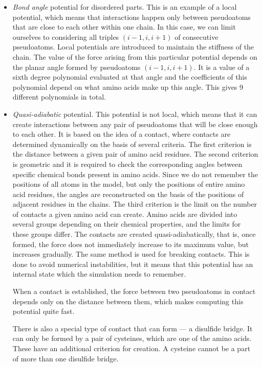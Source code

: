 \begin{itemize}
    \item \emph{Bond angle} potential for disordered parts.
    This is an example of a local potential, which means that interactions happen only between pseudoatoms that are close to each other within one chain. In this case, we can limit ourselves to considering all triples $(i-1,i,i+1)$ of consecutive pseudoatoms. Local potentials are introduced to maintain the stiffness of the chain. 
    The value of the force arising from this particular potential depends on the planar angle formed by pseudoatoms $(i-1,i,i+1)$. It is a value of a sixth degree polynomial evaluated at that angle and the coefficients of this polynomial depend on what amino acids make up this angle. This gives 9 different polynomials in total.
    
    \item \emph{Quasi-adiabatic} potential. This potential is not local, which means that it can create interactions between any pair of pseudoatoms that will be close enough to each other. It is based on the idea of a contact, where contacts are determined dynamically on the basis of several criteria. The first criterion is the distance between a given pair of amino acid residues. The second criterion is geometric and it is required to check the corresponding angles between specific chemical bonds present in amino acids. Since we do not remember the positions of all atoms in the model, but only the positions of entire amino acid residues, the angles are reconstructed on the basis of the positions of adjacent residues in the chains. The third criterion is the limit on the number of contacts a given amino acid can create. Amino acids are divided into several groups depending on their chemical properties, and the limits for these groups differ. The contacts are created quasi-adiabatically, that is, once formed, the force does not immediately increase to its maximum value, but increases gradually. The same method is used for breaking contacts. This is done to avoid numerical instabilities, but it means that this potential has an internal state which the simulation needs to remember.

    When a contact is established, the force between two pseudoatoms in contact depends only on the distance between them, which makes computing this potential quite fast. 
    
    \label{ref:disul} There is also a special type of contact that can form --- a disulfide bridge. It can only be formed by a pair of cysteines, which are one of the amino acids. These have an additional criterion for creation. A cysteine cannot be a part of more than one disulfide bridge.
    

\end{itemize}
